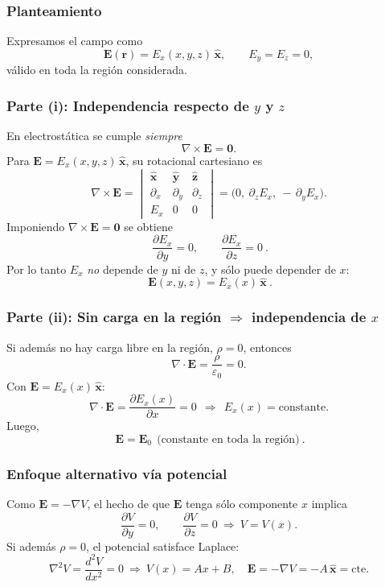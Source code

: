 \documentclass{article}
\begin{document}
\subsubsection*{Planteamiento}
Expresamos el campo como
\[
\mathbf E(\mathbf r)=E_x(x,y,z)\,\hat{\mathbf x},\qquad E_y=E_z=0,
\]
válido en toda la región considerada.

\subsubsection*{Parte (i): Independencia respecto de $y$ y $z$}
En electrostática se cumple \emph{siempre}
\[
\nabla\times \mathbf E=\mathbf 0.
\]
Para $\mathbf E=E_x(x,y,z)\,\hat{\mathbf x}$, su rotacional cartesiano es
\[
\nabla\times \mathbf E=
\begin{vmatrix}
\hat{\mathbf x} & \hat{\mathbf y} & \hat{\mathbf z}\\[2pt]
\partial_x & \partial_y & \partial_z\\[2pt]
E_x & 0 & 0
\end{vmatrix}
=\Big(0,\ \partial_z E_x,\ -\,\partial_y E_x\Big).
\]
Imponiendo $\nabla\times \mathbf E=\mathbf 0$ se obtiene
\[
\boxed{\ \frac{\partial E_x}{\partial y}=0,\qquad \frac{\partial E_x}{\partial z}=0\ }.
\]
Por lo tanto $E_x$ \emph{no} depende de $y$ ni de $z$, y sólo puede depender de $x$:
\[
\boxed{\ \mathbf E(x,y,z)=E_x(x)\,\hat{\mathbf x}\ }.
\]

\subsubsection*{Parte (ii): Sin carga en la región $\Rightarrow$ independencia de $x$}
Si además no hay carga libre en la región, $\rho=0$, entonces
\[
\nabla\cdot \mathbf E=\frac{\rho}{\varepsilon_0}=0.
\]
Con $\mathbf E=E_x(x)\,\hat{\mathbf x}$:
\[
\nabla\cdot \mathbf E=\frac{\partial E_x(x)}{\partial x}=0
\ \ \Longrightarrow\ \ E_x(x)=\text{constante}.
\]
Luego,
\[
\boxed{\ \mathbf E=\mathbf E_0\ \ \text{(constante en toda la región)}\ }.
\]

\subsubsection*{Enfoque alternativo vía potencial}
Como $\mathbf E=-\nabla V$, el hecho de que $\mathbf E$ tenga sólo componente $x$ implica
\[
\frac{\partial V}{\partial y}=0,\qquad \frac{\partial V}{\partial z}=0
\ \Rightarrow\ V=V(x).
\]
Si además $\rho=0$, el potencial satisface Laplace:
\[
\nabla^2 V=\frac{d^2 V}{dx^2}=0
\ \Rightarrow\ V(x)=Ax+B,\quad \mathbf E=-\nabla V=-A\,\hat{\mathbf x}=\text{cte}.
\]
\end{document}
